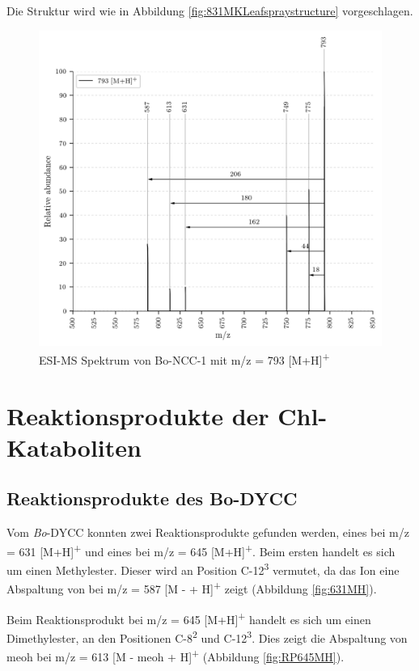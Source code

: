 Die Struktur wird wie in Abbildung \ref{fig:831MKLeafspraystructure} vorgeschlagen.

\begin{figure}[!htbp]
  \centering
  \includegraphics[width=\textwidth, height=0.7\textwidth]{figures/Kapitel7/Kataboliten/VWA_MS_793.png}
  \caption[ESI-MS Spektrum von Bo-NCC-1, Quelle: Autor]{ESI-MS Spektrum von Bo-NCC-1 mit m/z = 793 [M+H]\textsuperscript{+}}
  \label{fig:793MH}
\end{figure}



\pagebreak
\section{Reaktionsprodukte der Chl-Kataboliten}

\subsection{Reaktionsprodukte des Bo-DYCC}

Vom \textit{Bo}-DYCC konnten zwei Reaktionsprodukte gefunden werden, eines bei m/z = 631 [M+H]\textsuperscript{+} und eines bei m/z = 645 [M+H]\textsuperscript{+}. Beim ersten handelt es sich um einen Methylester. Dieser wird an Position C-12\textsuperscript{3} vermutet, da das Ion eine Abspaltung von  bei m/z = 587 [M -  + H]\textsuperscript{+} zeigt (Abbildung \ref{fig:631MH}). 

Beim Reaktionsprodukt bei m/z = 645 [M+H]\textsuperscript{+} handelt es sich um einen Dimethylester, an den Positionen C-8\textsuperscript{2} und C-12\textsuperscript{3}.  Dies zeigt die Abspaltung von \gls{meoh} bei m/z = 613 [M - \gls{meoh} + H]\textsuperscript{+} (Abbildung \ref{fig:RP645MH}). 

